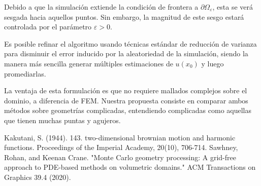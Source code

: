 \documentclass{article}
\begin{document}
Debido a que la simulación extiende la condición de frontera a $\partial \Omega_{\varepsilon}$, esta se verá sesgada hacia aquellos puntos. Sin embargo, la magnitud de este sesgo estará controlada por el parámetro $\varepsilon>0$.

Es posible refinar el algoritmo usando técnicas estándar de reducción de varianza para disminuir el error inducido por la aleatoriedad de la simulación, siendo la manera más sencilla generar múltiples estimaciones de $u(x_0)$ y luego promediarlas.

La ventaja de esta formulación es que no requiere mallados complejos sobre el
dominio, a diferencia de FEM. Nuestra propuesta consiste en comparar ambos métodos
sobre geometrías complicadas, entendiendo complicadas como aquellas que tienen
muchas puntas y agujeros.


\begin{thebibliography}{9}
Kakutani, S. (1944). 143. two-dimensional brownian motion and harmonic functions. Proceedings of the Imperial Academy, 20(10), 706-714.
Sawhney, Rohan, and Keenan Crane. "Monte Carlo geometry processing: A grid-free approach to PDE-based methods on volumetric domains." ACM Transactions on Graphics 39.4 (2020).
\end{thebibliography}
\end{document}

